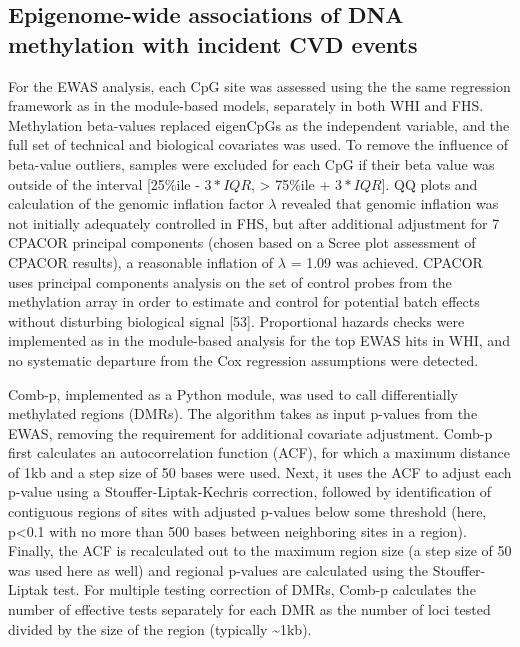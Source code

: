 \documentclass[]{article}
\theoremstyle{definition}
\theoremstyle{definition}
\theoremstyle{definition}
\theoremstyle{remark}
\begin{document}
\subsection{Epigenome-wide associations of DNA methylation with incident
CVD
events}\label{epigenome-wide-associations-of-dna-methylation-with-incident-cvd-events}

For the EWAS analysis, each CpG site was assessed using the the same
regression framework as in the module-based models, separately in both
WHI and FHS. Methylation beta-values replaced eigenCpGs as the
independent variable, and the full set of technical and biological
covariates was used. To remove the influence of beta-value outliers,
samples were excluded for each CpG if their beta value was outside of
the interval {[}25\%ile - \(3*IQR\), \textgreater{} 75\%ile +
\(3*IQR\){]}. QQ plots and calculation of the genomic inflation factor
\(\lambda\) revealed that genomic inflation was not initially adequately
controlled in FHS, but after additional adjustment for 7 CPACOR
principal components (chosen based on a Scree plot assessment of CPACOR
results), a reasonable inflation of \(\lambda\) = 1.09 was achieved.
CPACOR uses principal components analysis on the set of control probes
from the methylation array in order to estimate and control for
potential batch effects without disturbing biological signal {[}53{]}.
Proportional hazards checks were implemented as in the module-based
analysis for the top EWAS hits in WHI, and no systematic departure from
the Cox regression assumptions were detected.

Comb-p, implemented as a Python module, was used to call differentially
methylated regions (DMRs). The algorithm takes as input p-values from
the EWAS, removing the requirement for additional covariate adjustment.
Comb-p first calculates an autocorrelation function (ACF), for which a
maximum distance of 1kb and a step size of 50 bases were used. Next, it
uses the ACF to adjust each p-value using a Stouffer-Liptak-Kechris
correction, followed by identification of contiguous regions of sites
with adjusted p-values below some threshold (here, p\textless{}0.1 with
no more than 500 bases between neighboring sites in a region). Finally,
the ACF is recalculated out to the maximum region size (a step size of
50 was used here as well) and regional p-values are calculated using the
Stouffer-Liptak test. For multiple testing correction of DMRs, Comb-p
calculates the number of effective tests separately for each DMR as the
number of loci tested divided by the size of the region (typically
\textasciitilde{}1kb).
\end{document}
